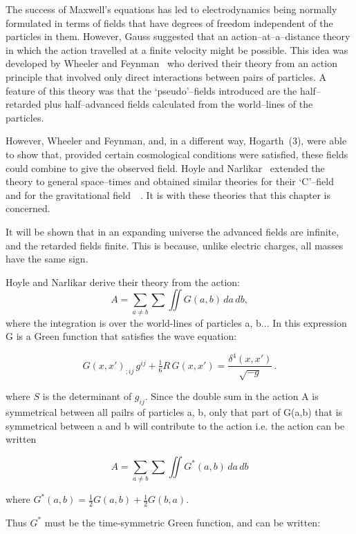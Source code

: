 

The success of Maxwell's equations has led to electrodynamics 
being normally formulated in terms of fields that have degrees 
of freedom independent of the particles in them. However, Gauss 
suggested that an action--at--a--distance theory in which the 
action travelled at a finite velocity might be possible. 
This idea was developed by Wheeler and Feynman~\cite{2,3} who derived 
their theory from an action principle that involved only direct 
interactions between pairs of particles. A feature of this theory 
was that the `pseudo'--fields introduced are the half--retarded 
plus half--advanced fields calculated from the world--lines of 
the particles. 

However, Wheeler and Feynman, and, in a different way, Hogarth~(3), 
were able to show that, provided certain cosmological conditions 
were satisfied, these fields could combine to give the observed field. 
Hoyle and Narlikar~\cite{4} extended the theory to general space--times 
and obtained similar theories for their `C'--field~\cite{5} and for the 
gravitational field~~\cite{6}. It is with these theories that this chapter 
is concerned.

It will be shown that in an expanding universe the advanced 
fields are infinite, and the retarded fields finite. 
This is because, unlike electric charges, all masses have the same sign.


Hoyle and Narlikar derive their theory from the action:
\[
A = \sum_{a \ne b} \sum \iint G(a,b)\, da\, db ,
\]
where the integration is over the world-lines of particles a, b...
In this expression G is a Green function
that satisfies the wave equation: 

\[
G(x,x')_{;ij}\, g^{ij} + \tfrac{1}{6} R\, G(x,x')
= \frac{\delta^{4}(x,x')}{\sqrt{-g}} \, .
\]


where \(S\) is the determinant of \(g_{ij}\).
Since the double sum in the action A is symmetrical between all pailrs of
particles a, b, only that part of G(a,b) that is symmetrical between a and b will contribute to the action
i.e. the action can be written

\[
A = \sum_{a \ne b} \sum \iint G^{*}(a,b)\, da\, db
\]

\noindent
where \quad 
\( G^{*}(a,b) = \tfrac{1}{2} G(a,b) + \tfrac{1}{2} G(b,a) \).

\medskip

Thus \quad \( G^{*} \) \quad must be the time-symmetric Green function, and can be written:

